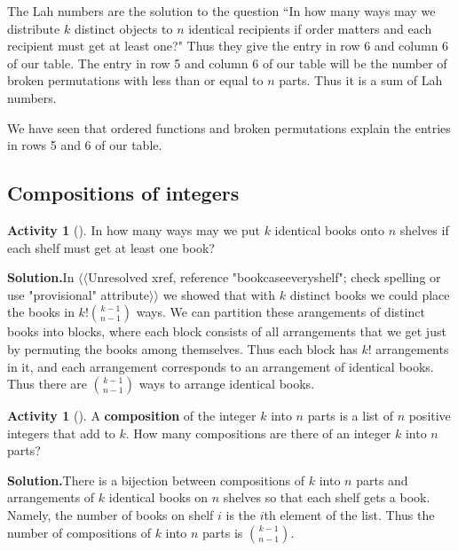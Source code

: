 \documentclass[10pt,]{book}
\newcommand{\terminology}[1]{\textbf{#1}}
\theoremstyle{plain}
\theoremstyle{definition}
\newtheorem{activity}[project]{Activity}
\numberwithin{equation}{chapter}
\begin{document}
\par
The Lah numbers are the solution to the question ``In how many ways may we distribute \(k\) distinct objects to \(n\) identical recipients if order matters and each recipient must get at least one?" Thus they give the entry in row 6 and column 6 of our table. The entry in row 5 and column 6 of our table will be the number of broken permutations with less than or equal to \(n\) parts. Thus it is a sum of Lah numbers.%
\par
We have seen that ordered functions and broken permutations explain the entries in rows 5 and 6 of our table.%
\typeout{************************************************}
\typeout{************************************************}
\subsection[{Compositions of integers}]{Compositions of integers}\label{subsection-31}
\begin{activity}[]\label{activity-114}
In how many ways may we put \(k\) identical books onto \(n\) shelves if each shelf must get at least one book?%
\par\medskip\noindent%
\textbf{Solution.}\quad In {$\langle\langle$Unresolved xref, reference "bookcaseeveryshelf"; check spelling or use "provisional" attribute$\rangle\rangle$} we showed that with \(k\) distinct books we could place the books in \(k!\binom{k-1}{n-1}\) ways. We can partition these arangements of distinct books into blocks, where each block consists of all arrangements that we get just by permuting the books among themselves. Thus each block has \(k!\) arrangements in it, and each arrangement corresponds to an arrangement of identical books. Thus there are \(\binom{k-1}{n-1}\) ways to arrange identical books.%
\end{activity}
\begin{activity}[]\label{compositionagian}
A \terminology{composition} of the integer \(k\) into \(n\) parts is a list of \(n\) positive integers that add to \(k\).  How many compositions are there of an integer \(k\) into \(n\) parts?%
\par\medskip\noindent%
\textbf{Solution.}\quad There is a bijection between compositions of \(k\) into \(n\) parts and arrangements of \(k\) identical books on \(n\) shelves so that each shelf gets a book. Namely, the number of books on shelf \(i\) is the \(i\)th element of the list. Thus the number of compositions of \(k\) into \(n\) parts is \(\binom{k-1}{n-1}\).%
\end{activity}
\end{document}
